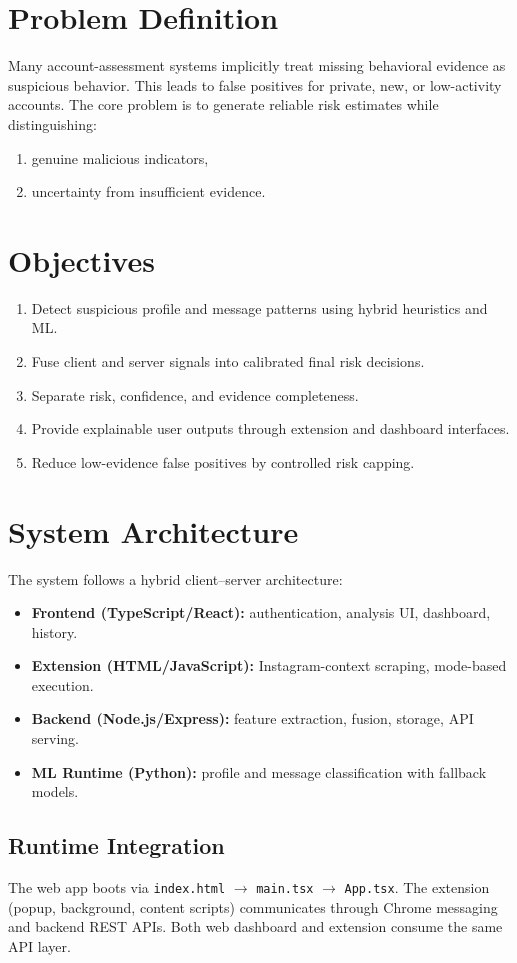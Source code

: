 ﻿\documentclass[conference]{IEEEtran}
\begin{document}
\section{Problem Definition}
Many account-assessment systems implicitly treat missing behavioral evidence as suspicious behavior. This leads to false positives for private, new, or low-activity accounts. The core problem is to generate reliable risk estimates while distinguishing:
\begin{enumerate}
\item genuine malicious indicators,
\item uncertainty from insufficient evidence.
\end{enumerate}

\section{Objectives}
\begin{enumerate}
\item Detect suspicious profile and message patterns using hybrid heuristics and ML.
\item Fuse client and server signals into calibrated final risk decisions.
\item Separate risk, confidence, and evidence completeness.
\item Provide explainable user outputs through extension and dashboard interfaces.
\item Reduce low-evidence false positives by controlled risk capping.
\end{enumerate}

\section{System Architecture}
The system follows a hybrid client--server architecture:
\begin{itemize}
\item \textbf{Frontend (TypeScript/React):} authentication, analysis UI, dashboard, history.
\item \textbf{Extension (HTML/JavaScript):} Instagram-context scraping, mode-based execution.
\item \textbf{Backend (Node.js/Express):} feature extraction, fusion, storage, API serving.
\item \textbf{ML Runtime (Python):} profile and message classification with fallback models.
\end{itemize}

\subsection{Runtime Integration}
The web app boots via \texttt{index.html} $\rightarrow$ \texttt{main.tsx} $\rightarrow$ \texttt{App.tsx}. The extension (popup, background, content scripts) communicates through Chrome messaging and backend REST APIs. Both web dashboard and extension consume the same API layer.
\end{document}

